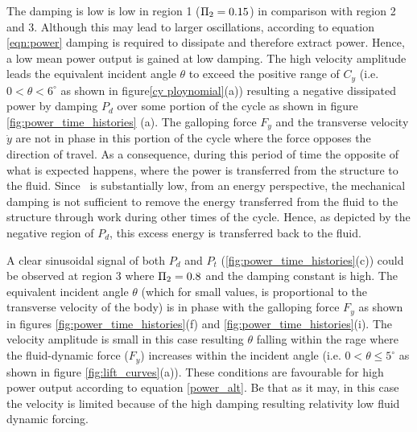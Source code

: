 

The damping is low is low in region 1 ($\Pi_2=0.15$) in comparison with region 2 and 3. Although this may lead to larger oscillations, according to equation \ref{eqn:power} damping is required to dissipate and therefore extract power. Hence, a low mean power output is gained at low damping. The high velocity amplitude leads the equivalent incident angle $\theta$ to exceed the positive range of $C_y$ (i.e. $0<\theta<6^\circ$ as shown in figure\ref{cy ploynomial}(a)) resulting a negative dissipated power by damping $P_d$ over some portion of the cycle as shown in figure \ref{fig:power_time_histories} (a). The galloping force $F_y$ and the transverse velocity $\dot{y}$ are not in phase in this portion of the cycle where the force opposes the direction of travel. As a consequence, during this period of time the opposite of what is expected happens, where the power is transferred from the structure to the fluid. Since \massdamp \ is substantially low, from an energy perspective, the mechanical damping is not sufficient to remove the energy transferred from the fluid to the structure through work during other times of the cycle. Hence, as depicted by the negative region of $P_d$, this excess energy is transferred back to the fluid.



A clear sinusoidal signal of both $P_d$ and $P_t$ (\ref{fig:power_time_histories}(c)) could be observed at region 3 where $\Pi_2=0.8$ and the damping constant is high. The equivalent incident angle $\theta$ (which for small values, is proportional to the transverse velocity of the body) is in phase with the galloping force $F_y$ as shown in figures \ref{fig:power_time_histories}(f) and  \ref{fig:power_time_histories}(i). The velocity amplitude is small in this case resulting $\theta$ falling within the rage where the fluid-dynamic force ($F_y$) increases within the incident angle (i.e. $0<\theta \leq 5^\circ$ as shown in figure \ref{fig:lift_curves}(a)). These conditions are favourable for high power output according to equation \ref{power_alt}. Be that as it may, in this case the velocity is limited because of the high damping resulting relativity low fluid dynamic forcing. 

